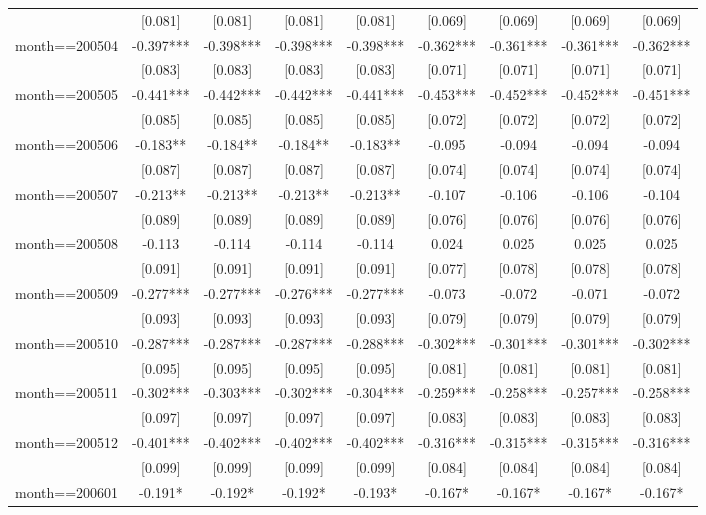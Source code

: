 \documentclass[]{article}
\begin{document}
\begin{tabular}{lcccccccc}
 & [0.081] & [0.081] & [0.081] & [0.081] & [0.069] & [0.069] & [0.069] & [0.069] \\
month==200504 & -0.397*** & -0.398*** & -0.398*** & -0.398*** & -0.362*** & -0.361*** & -0.361*** & -0.362*** \\
 & [0.083] & [0.083] & [0.083] & [0.083] & [0.071] & [0.071] & [0.071] & [0.071] \\
month==200505 & -0.441*** & -0.442*** & -0.442*** & -0.441*** & -0.453*** & -0.452*** & -0.452*** & -0.451*** \\
 & [0.085] & [0.085] & [0.085] & [0.085] & [0.072] & [0.072] & [0.072] & [0.072] \\
month==200506 & -0.183** & -0.184** & -0.184** & -0.183** & -0.095 & -0.094 & -0.094 & -0.094 \\
 & [0.087] & [0.087] & [0.087] & [0.087] & [0.074] & [0.074] & [0.074] & [0.074] \\
month==200507 & -0.213** & -0.213** & -0.213** & -0.213** & -0.107 & -0.106 & -0.106 & -0.104 \\
 & [0.089] & [0.089] & [0.089] & [0.089] & [0.076] & [0.076] & [0.076] & [0.076] \\
month==200508 & -0.113 & -0.114 & -0.114 & -0.114 & 0.024 & 0.025 & 0.025 & 0.025 \\
 & [0.091] & [0.091] & [0.091] & [0.091] & [0.077] & [0.078] & [0.078] & [0.078] \\
month==200509 & -0.277*** & -0.277*** & -0.276*** & -0.277*** & -0.073 & -0.072 & -0.071 & -0.072 \\
 & [0.093] & [0.093] & [0.093] & [0.093] & [0.079] & [0.079] & [0.079] & [0.079] \\
month==200510 & -0.287*** & -0.287*** & -0.287*** & -0.288*** & -0.302*** & -0.301*** & -0.301*** & -0.302*** \\
 & [0.095] & [0.095] & [0.095] & [0.095] & [0.081] & [0.081] & [0.081] & [0.081] \\
month==200511 & -0.302*** & -0.303*** & -0.302*** & -0.304*** & -0.259*** & -0.258*** & -0.257*** & -0.258*** \\
 & [0.097] & [0.097] & [0.097] & [0.097] & [0.083] & [0.083] & [0.083] & [0.083] \\
month==200512 & -0.401*** & -0.402*** & -0.402*** & -0.402*** & -0.316*** & -0.315*** & -0.315*** & -0.316*** \\
 & [0.099] & [0.099] & [0.099] & [0.099] & [0.084] & [0.084] & [0.084] & [0.084] \\
month==200601 & -0.191* & -0.192* & -0.192* & -0.193* & -0.167* & -0.167* & -0.167* & -0.167* \\

\end{tabular}
\end{document}
